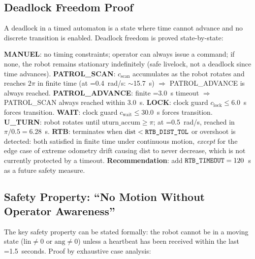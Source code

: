 \subsection{Deadlock Freedom Proof}

A deadlock in a timed automaton is a state where time cannot advance and no discrete transition is enabled. Deadlock freedom is proved state-by-state:

\begin{eqblock}
\textbf{MANUEL}: no timing constraints; operator can always issue a command; if none, the robot remains stationary indefinitely (safe livelock, not a deadlock since time advances). \textbf{PATROL\_SCAN}: $c_{\text{scan}}$ accumulates as the robot rotates and reaches $2\pi$ in finite time (at =0.4~rad/s: $\sim$15.7~s) $\Rightarrow$ PATROL\_ADVANCE is always reached. \textbf{PATROL\_ADVANCE}: finite =3.0~s timeout $\Rightarrow$ PATROL\_SCAN always reached within 3.0~s. \textbf{LOCK}: clock guard $c_{\text{lock}}\leq6.0$~s forces transition. \textbf{WAIT}: clock guard $c_{\text{wait}}\leq30.0$~s forces transition. \textbf{U\_TURN}: robot rotates until $\text{uturn\_accum}\geq\pi$; at =0.5~rad/s, reached in $\pi/0.5=6.28$~s. \textbf{RTB}: terminates when $\text{dist}<\code{RTB\_DIST\_TOL}$ or overshoot is detected: both satisfied in finite time under continuous motion, \emph{except} for the edge case of extreme odometry drift causing $\text{dist}$ to never decrease, which is not currently protected by a timeout. \textbf{Recommendation}: add $\code{RTB\_TIMEOUT}=120$~s as a future safety measure.
\end{eqblock}

\subsection{Safety Property: ``No Motion Without Operator Awareness''}

The key safety property can be stated formally: the robot cannot be in a moving state ($\text{lin}\neq0$ or $\text{ang}\neq0$) unless a heartbeat has been received within the last =1.5~seconds. Proof by exhaustive case analysis:

